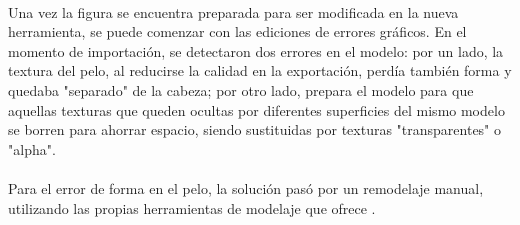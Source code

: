 \documentclass{subfiles}
\begin{document}
    \paragraph{}
    Una vez la figura se encuentra preparada para ser modificada en la nueva herramienta, se puede comenzar con las ediciones de errores gráficos. En el momento de importación, se detectaron dos errores en el modelo: por un lado, la textura del pelo, al reducirse la calidad en la exportación, perdía también forma y quedaba "separado" de la cabeza; por otro lado, \makehuman prepara el modelo para que aquellas texturas que queden ocultas por diferentes superficies del mismo modelo se borren para ahorrar espacio, siendo sustituidas por texturas "transparentes" o "alpha".

    \paragraph{}
    Para el error de forma en el pelo, la solución pasó por un remodelaje manual, utilizando las propias herramientas de modelaje que ofrece \blender.
\end{document}
